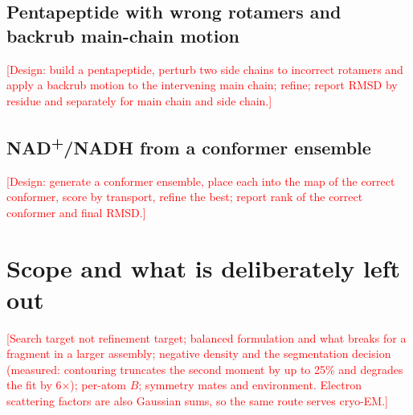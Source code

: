 \documentclass[11pt,a4paper]{article}
\newcommand{\TODO}[1]{\textcolor{red}{[#1]}}
\begin{document}
\subsection{Pentapeptide with wrong rotamers and backrub main-chain motion}
\TODO{Design: build a pentapeptide, perturb two side chains to incorrect rotamers and apply
a backrub motion to the intervening main chain; refine; report RMSD by residue and
separately for main chain and side chain.}

\subsection{NAD\textsuperscript{+}/NADH from a conformer ensemble}
\TODO{Design: generate a conformer ensemble, place each into the map of the correct
conformer, score by transport, refine the best; report rank of the correct conformer and
final RMSD.}

\section{Scope and what is deliberately left out}

\TODO{Search target not refinement target; balanced formulation and what breaks for a
fragment in a larger assembly; negative density and the segmentation decision (measured:
contouring truncates the second moment by up to 25\% and degrades the fit by 6$\times$);
per-atom $B$; symmetry mates and environment. Electron scattering factors are also Gaussian
sums, so the same route serves cryo-EM.}
\end{document}
